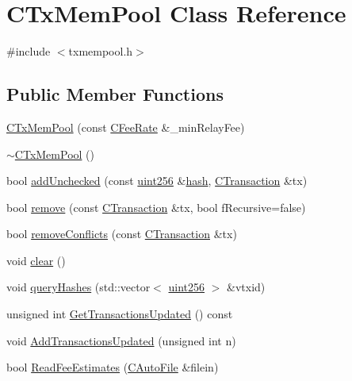 \hypertarget{class_c_tx_mem_pool}{}\section{C\+Tx\+Mem\+Pool Class Reference}
\label{class_c_tx_mem_pool}


{\ttfamily \#include $<$txmempool.\+h$>$}

\subsection*{Public Member Functions}
\begin{DoxyCompactItemize}
\item 
\hyperlink{class_c_tx_mem_pool_a82147548cfa962975690d1926b717c1c}{C\+Tx\+Mem\+Pool} (const \hyperlink{class_c_fee_rate}{C\+Fee\+Rate} \&\+\_\+min\+Relay\+Fee)
\item 
\hyperlink{class_c_tx_mem_pool_a038108efea0c4312e5bed2ce064702b2}{$\sim$\+C\+Tx\+Mem\+Pool} ()
\item 
bool \hyperlink{class_c_tx_mem_pool_a1203ac5cf3bdb88af4922705afad555d}{add\+Unchecked} (const \hyperlink{classuint256}{uint256} \&\hyperlink{cache_8cc_a11ecb029164e055f28f4123ce3748862}{hash}, \hyperlink{class_c_transaction}{C\+Transaction} \&tx)
\item 
bool \hyperlink{class_c_tx_mem_pool_a258e23e3a434045d522a8cebc5a039ce}{remove} (const \hyperlink{class_c_transaction}{C\+Transaction} \&tx, bool f\+Recursive=false)
\item 
bool \hyperlink{class_c_tx_mem_pool_ab6f7c0b3ddb8383767d97d22103ffd9b}{remove\+Conflicts} (const \hyperlink{class_c_transaction}{C\+Transaction} \&tx)
\item 
void \hyperlink{class_c_tx_mem_pool_a6dba6bce4139392751321438a29b6b09}{clear} ()
\item 
void \hyperlink{class_c_tx_mem_pool_a42fa7d41a45562d02e356f2e7708bb02}{query\+Hashes} (std\+::vector$<$ \hyperlink{classuint256}{uint256} $>$ \&vtxid)
\item 
unsigned int \hyperlink{class_c_tx_mem_pool_a26a5bdb66c9b84f73d1d30fea8e31cc9}{Get\+Transactions\+Updated} () const 
\item 
void \hyperlink{class_c_tx_mem_pool_a3039b67e5eebaa3ff830261c192816f2}{Add\+Transactions\+Updated} (unsigned int n)
\item 
bool \hyperlink{class_c_tx_mem_pool_a0dbbcb6a3b7e1a6c564410668c12cd4f}{Read\+Fee\+Estimates} (\hyperlink{class_c_auto_file}{C\+Auto\+File} \&filein)

\end{DoxyCompactItemize}
